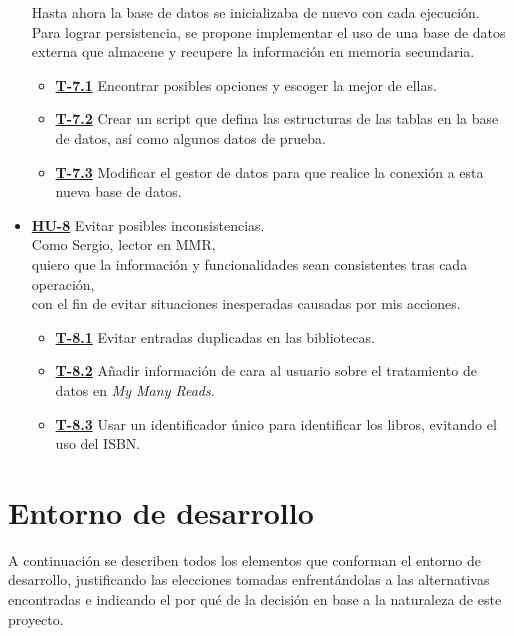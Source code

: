 \begin{itemize}
    Hasta ahora la base de datos se inicializaba de nuevo con cada ejecución. \\
    Para lograr persistencia, se propone implementar el uso de una base de datos externa que almacene y recupere la información en memoria secundaria.
    \begin{itemize}
        \item \href{https://github.com/Anglepi/My-Many-Reads/issues/77}{\textbf{T-7.1}} Encontrar posibles opciones y escoger la mejor de ellas.
        \item \href{https://github.com/Anglepi/My-Many-Reads/issues/78}{\textbf{T-7.2}} Crear un script que defina las estructuras de las tablas en la base de datos, así como algunos datos de prueba.
        \item \href{https://github.com/Anglepi/My-Many-Reads/issues/79}{\textbf{T-7.3}} Modificar el gestor de datos para que realice la conexión a esta nueva base de datos.
    \end{itemize}
    \item \href{https://github.com/Anglepi/My-Many-Reads/issues/98}{\textbf{HU-8}} Evitar posibles inconsistencias. \\
    Como Sergio, lector en MMR, \\
    quiero que la información y funcionalidades sean consistentes tras cada operación, \\
    con el fin de evitar situaciones inesperadas causadas por mis acciones.
    \begin{itemize}
        \item \href{https://github.com/Anglepi/My-Many-Reads/issues/93}{\textbf{T-8.1}} Evitar entradas duplicadas en las bibliotecas.
        \item \href{https://github.com/Anglepi/My-Many-Reads/issues/94}{\textbf{T-8.2}} Añadir información de cara al usuario sobre el tratamiento de datos en \textit{My Many Reads}.
        \item \href{https://github.com/Anglepi/My-Many-Reads/issues/96}{\textbf{T-8.3}} Usar un identificador único para identificar los libros, evitando el uso del ISBN.
    \end{itemize}
\end{itemize}

\section{Entorno de desarrollo}

A continuación se describen todos los elementos que conforman el entorno de desarrollo, justificando las elecciones tomadas enfrentándolas a las alternativas encontradas e indicando el por qué de la decisión en base a la naturaleza de este proyecto.

